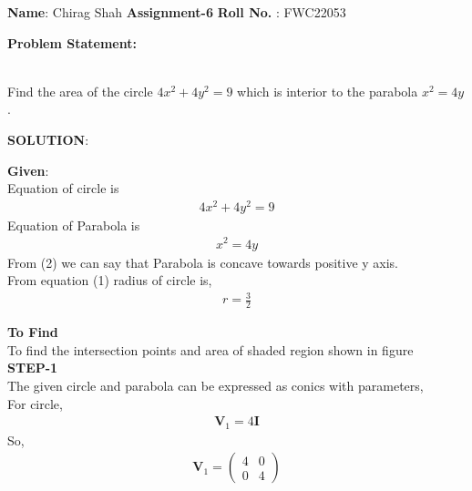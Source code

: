 \documentclass[10pt,a4paper]{report}
\newcommand{\myvec}[1]{\ensuremath{\begin{pmatrix}#1\end{pmatrix}}}
\let\vec\mathbf
\let\vec\mathbf
\begin{document}
\raggedright \textbf{Name}:\hspace{1mm} Chirag Shah\hspace{3cm} \Large \textbf{Assignment-6}\hspace{2.5cm} %
\normalsize \textbf{Roll No.} :\hspace{1mm} FWC22053\vspace{1cm}
\begin{multicols}{2}

\raggedright \textbf{Problem Statement:}\vspace{2mm}
\raggedright \\ Find the area of the circle $4x^2+4y^2=9$ which is interior to the parabola $x^2=4y$.\\
\vspace{5mm}
\raggedright \textbf{SOLUTION}:\vspace{2mm}\\

\raggedright \textbf{Given}:\vspace{2mm}\\
Equation of circle is \\\vspace{1mm}
\begin{align}
4x^2+4y^2=9
\end{align}
Equation of Parabola is \\ \vspace{1mm}
\begin{align}
x^2=4y 
\end{align}
From (2) we can say that Parabola is concave towards positive y axis.\\ \vspace{2mm}
From equation (1) radius of circle is,\\ \vspace{1mm}
\begin{align}
r= \frac{3}{2}
\end{align}

\textbf{To Find }\vspace{2mm}\\
To find the intersection points and area of shaded region shown in figure\vspace{2mm}  \\ 
\textbf{STEP-1}\vspace{2mm}\\
The given circle and parabola can be expressed as conics with parameters,\\ \vspace{1mm}
For circle,\\ \vspace{1mm}
\begin{align}
\vec{V}_1=4\vec{I}
\end{align}
So, \\
\begin{align}
\vec{V}_1=\myvec{
4 & 0\\
0 & 4
}
\end{align} 


\end{multicols}
\end{document}
